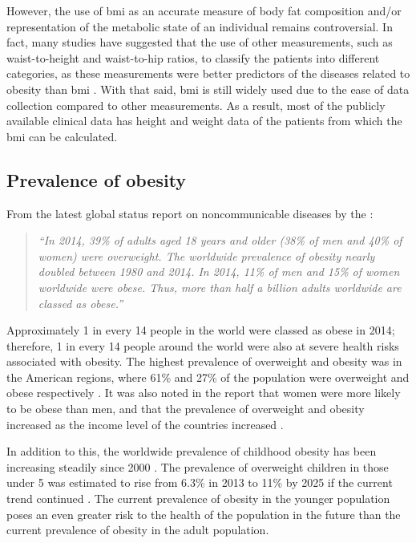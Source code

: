 However, the use of \gls{bmi} as an accurate measure of body fat composition and/or representation of the metabolic state of an individual remains controversial.
In fact, many studies have suggested that the use of other measurements, such as waist-to-height and waist-to-hip ratios, to classify the patients into different categories, as these measurements were better predictors of the diseases related to obesity than \gls{bmi} \citep{Dalton2003,Gelber2008,Lee2008}.
With that said, \gls{bmi} is still widely used due to the ease of data collection compared to other measurements.
As a result, most of the publicly available clinical data has height and weight data of the patients from which the \gls{bmi} can be calculated.

\subsection{Prevalence of obesity}
\label{sub:prevalence_of_obesity}

From the latest global status report on noncommunicable diseases by the \citet{WHO2014}:
\begin{quote}
	\textit{
		``In 2014, 39\% of adults aged 18 years and older (38\% of men and 40\% of women) were overweight.
		The worldwide prevalence of obesity nearly doubled between 1980 and 2014.
		In 2014, 11\% of men and 15\% of women worldwide were obese.
		Thus, more than half a billion adults worldwide are classed as obese.''
	}
\end{quote}

\noindent
Approximately 1 in every 14 people in the world were classed as obese in 2014; therefore, 1 in every 14 people around the world were also at severe health risks associated with obesity.
The highest prevalence of overweight and obesity was in the American regions, where 61\% and 27\% of the population were overweight and obese respectively \citep{WHO2014}.
It was also noted in the report that women were more likely to be obese than men, and that the prevalence of overweight and obesity increased as the income level of the countries increased \citep{WHO2014}.

In addition to this, the worldwide prevalence of childhood obesity has been increasing steadily since 2000 \citep{WHO2014}.
The prevalence of overweight children in those under 5 was estimated to rise from 6.3\% in 2013 to 11\% by 2025 if the current trend continued \citep{WHO2014}.
The current prevalence of obesity in the younger population poses an even greater risk to the health of the population in the future than the current prevalence of obesity in the adult population.


